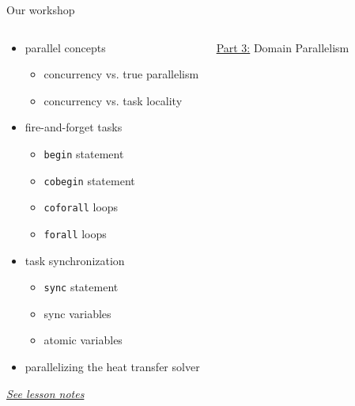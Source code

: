 \documentclass[10pt,xcolor=pdftex,dvipsnames,table]{beamer}
\newcommand{\tc}{\textcolor}
\begin{document}
\begin{frame}{Our workshop}
\begin{columns}[]
\begin{block}{}
{\begin{itemize}
        \item parallel concepts
          {\let\small\scriptsize \small
            \begin{itemize}\setlength{\itemsep}{0.5mm}
            \item concurrency vs. true parallelism
            \item concurrency vs. task locality
          \end{itemize}}
        \item fire-and-forget tasks
          {\let\small\scriptsize \small
            \begin{itemize}\setlength{\itemsep}{0.5mm}
            \item \tc{Mahogany}{\texttt{begin}} statement
            \item \tc{Mahogany}{\texttt{cobegin}} statement
            \item \tc{Mahogany}{\texttt{coforall}} loops
            \item \tc{Mahogany}{\texttt{forall}} loops
          \end{itemize}}
        \item task synchronization
          {\let\small\scriptsize \small
            \begin{itemize}\setlength{\itemsep}{0.5mm}
            \item \tc{Mahogany}{\texttt{sync}} statement
            \item sync variables
            \item atomic variables
          \end{itemize}}
        \item parallelizing the heat transfer solver
        \end{itemize}}
      \begin{center}
        \href{http://bit.ly/2CDHCUS}{\tc{Mahogany}{\it See lesson notes}}
      \end{center}
    \end{block}
    \begin{block}{}
      \begin{center}
        {\sc \underline{Part 3:} Domain Parallelism}
      \end{center}
      \vspace{-2mm}

\end{block}
\end{columns}
\end{frame}
\end{document}
